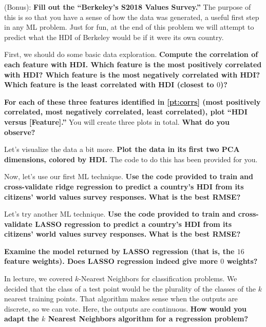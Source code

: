 \documentclass[preview]{standalone}
\begin{document}
\begin{Parts}


\Part (Bonus): \textbf{Fill out the ``Berkeley's S2018 Values Survey.''} The purpose of this is so that you have a sense of how the data was generated, a useful first step in any ML problem. Just for fun, at the end of this problem we will attempt to predict what the HDI of Berkeley would be if it were its own country.




\Part \label{pt:corrs} First, we should do some basic data exploration. \textbf{Compute the correlation of each feature with HDI. Which feature is the most positively correlated with HDI? Which feature is the most negatively correlated with HDI? Which feature is the least correlated with HDI (closest to $0$)?}




\Part \textbf{For each of these three features identified in \ref{pt:corrs} (most positively correlated, most negatively correlated, least correlated), plot ``HDI versus [Feature].''} You will create three plots in total. \textbf{What do you observe?}




\Part Let's visualize the data a bit more. \textbf{Plot the data in its first two PCA dimensions, colored by HDI.} The code to do this has been provided for you.




\Part Now, let's use our first ML technique. \textbf{Use the code provided to train and cross-validate ridge regression to predict a country's HDI from its citizens' world values survey responses.} \textbf{What is the best RMSE?}




\Part Let's try another ML technique. \textbf{Use the code provided to train and cross-validate LASSO regression to predict a country's HDI from its citizens' world values survey responses.} \textbf{What is the best RMSE?}




\Part \textbf{Examine the model returned by LASSO regression (that is, the $16$ feature weights). Does LASSO regression indeed give more $0$ weights?}




\Part In lecture, we covered $k$-Nearest Neighbors for classification problems. We decided that the class of a test point would be the plurality of the classes of the $k$ nearest training points. That algorithm makes sense when the outputs are discrete, so we can vote. Here, the outputs are continuous. \textbf{How would you adapt the $k$ Nearest Neighbors algorithm for a regression problem?}





\end{Parts}
\end{document}
